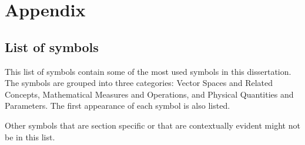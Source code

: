 \documentclass[main.tex]{subfiles}
\begin{document}
\chapter*{Appendix}

\section*{List of symbols}

This list of symbols contain some of the most used symbols in this dissertation. The symbols are grouped into three categories: Vector Spaces and Related Concepts, Mathematical Measures and Operations, and Physical Quantities and Parameters. The first appearance of each symbol is also listed.

Other symbols that are section specific or that are contextually evident might not be in this list.
\end{document}
